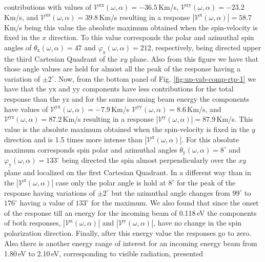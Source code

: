 \documentclass[prb,11pt,tightenlines,twocolumn,aps]{revtex4-1}
\begin{document}
contributions with values of
% 
$\mathcal{V}^{\mathrm{xx}}(\omega,\alpha)=-36.5$\,Km/s,
$\mathcal{V}^{\mathrm{xy}}(\omega,\alpha)=-23.2$\,Km/s, and
$\mathcal{V}^{\mathrm{xz}}(\omega,\alpha)= 39.8$\,Km/s resulting in a response
$|\mathcal{V}^{\mathrm{x}}(\omega,\alpha)|=58.7$\,Km/s being this value the
absolute maximum obtained when the spin-velocity is fixed in the $x$ direction.
% 
To this value corresponds the polar and azimuthal spin
angles of $\theta_{\mathrm{x}}(\omega,\alpha)=47$ and
$\varphi_{\mathrm{x}}(\omega,\alpha)=212$, respectively, being directed upper
the third Cartesian Quadrant of the $xy$ plane. Also from this figure we have
that those angle values are held for almost all the peak of the response having
a variation of $\pm 2^{\circ}$.
% 
Now, from the bottom panel of Fig. \ref{fig:up-vab-comp-rtp-1} we have that the
$\mathrm{yx}$ and $\mathrm{yy}$ components have less contributions for the total
response than the $\mathrm{yz}$ and for the same incoming beam energy the
components have values of
% 
$\mathcal{V}^{\mathrm{yx}}(\omega,\alpha)= -7.9$\,Km/s 
$\mathcal{V}^{\mathrm{yy}}(\omega,\alpha)=  8.6$\,Km/s, and
$\mathcal{V}^{\mathrm{yz}}(\omega,\alpha)= 87.2$\,Km/s 
% 
resulting in a response $|\mathcal{V}^{\mathrm{y}}(\omega,\alpha)|=87.9$\,Km/s.
This value is the absolute maximum obtained when the spin-velocity is fixed in
the $y$ direction and is 1.5 times more intense than
$|\mathcal{V}^{\mathrm{x}}(\omega,\alpha)|$. For this absolute maximum
corresponds spin polar and azimuthal angles $\theta_{\mathrm{y}}(\omega,\alpha)
= 8^{\circ}$ and $\varphi_{\mathrm{y}}(\omega,\alpha) = 133^{\circ}$ being
directed the spin almost perpendicularly over the $xy$ plane and  localized on
the first Cartesian Quadrant. 
% 
In a different way than in the $|\mathcal{V}^{\mathrm{x}}(\omega,\alpha)|$ case
only the polar angle is hold at $8^{\circ}$ for the peak of the response having
variations of $\pm 2^{\circ}$ but the azimuthal angle changes from $99^{\circ}$
to $176^{\circ}$ having a value of $133^{\circ}$ for the maximum.
% 
We also found that since the onset of the response till an energy for the
incoming beam of 0.118\,eV the components of both responses,
$|\mathcal{V}^{\mathrm{x}}(\omega,\alpha)|$ and
$|\mathcal{V}^{\mathrm{y}}(\omega,\alpha)|$, have no change in the spin
polarization direction. Finally, after this energy value the responses go to
zero.
Also there is another energy range of interest for an incoming energy beam from
1.80\,eV to 2.10\,eV, corresponding to visible radiation, presented
\end{document}
